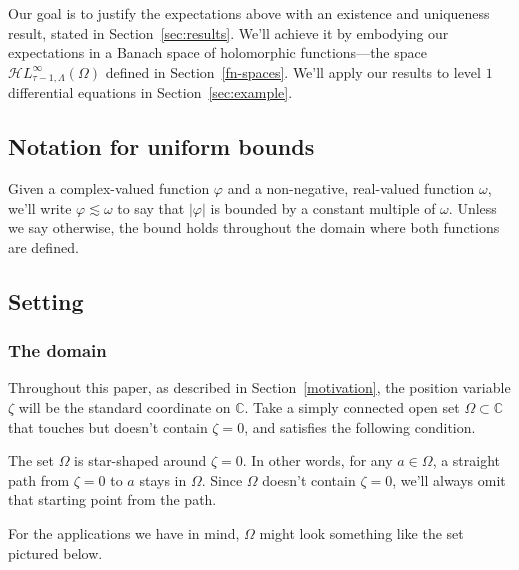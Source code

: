 \documentclass{article}
\makeatletter
\theoremstyle{definition}
\theoremstyle{plain}
\newcommand{\cond}[1]{\item[(\textsc{#1})]\protected@edef\@currentlabel{\textsc{#1}}}
\newcommand{\C}{\mathbb{C}}
\newcommand{\singexp}[2]{\mathcal{H}L^\infty_{#1, #2}}
\newcommand{\domain}{\Omega}
\makeatother
\begin{document}
Our goal is to justify the expectations above with an existence and uniqueness result, stated in Section~\ref{sec:results}. We'll achieve it by embodying our expectations in a Banach space of holomorphic functions---the space $\singexp{\tau-1}{\Lambda}(\domain)$ defined in Section~\ref{fn-spaces}. We'll apply our results to level $1$ differential equations in Section~\ref{sec:example}.
\subsection{Notation for uniform bounds}
Given a complex-valued function $\varphi$ and a non-negative, real-valued function $\omega$, we'll write $\varphi \lesssim \omega$ to say that $|\varphi|$ is bounded by a constant multiple of $\omega$. Unless we say otherwise, the bound holds throughout the domain where both functions are defined.
\subsection{Setting}\label{setting}
\subsubsection{The domain}\label{setting:domain}
Throughout this paper, as described in Section~\ref{motivation}, the position variable $\zeta$ will be the standard coordinate on $\C$. Take a simply connected open set $\domain \subset \C$ that touches but doesn't contain $\zeta = 0$, and satisfies the following condition.
\begin{conditions}
\cond{star}\label{cond:star} The set $\domain$ is star-shaped around $\zeta = 0$. In other words, for any $a \in \domain$, a straight path from $\zeta = 0$ to $a$ stays in $\domain$. Since $\domain$ doesn't contain $\zeta = 0$, we'll always omit that starting point from the path.
\end{conditions}
For the applications we have in mind, $\domain$ might look something like the set pictured below.
\begin{center}
\end{center}
\end{document}

